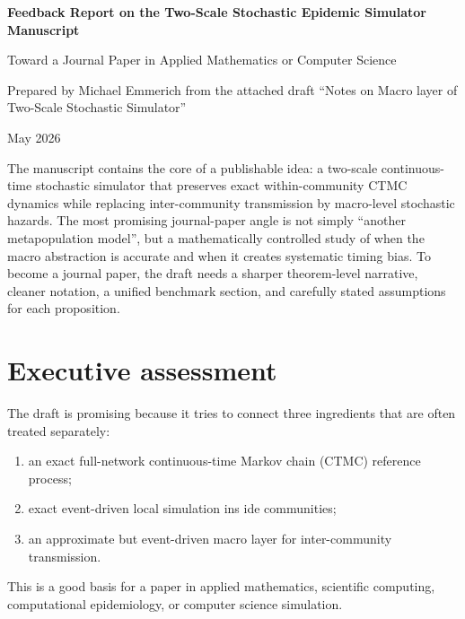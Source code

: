 \documentclass[12pt,a4paper]{article}
\theoremstyle{definition}
\newcommand{\1}{\mathbf{1}}
\begin{document}
\begin{center}
    {\LARGE \bfseries Feedback Report on the Two-Scale Stochastic Epidemic Simulator Manuscript}\par
    \vspace{0.5em}
    {\large Toward a Journal Paper in Applied Mathematics or Computer Science}\par
    \vspace{0.8em}
    {\normalsize Prepared by Michael Emmerich from the attached draft ``Notes on Macro layer of Two-Scale Stochastic Simulator''}\par
    \vspace{0.3em}
    {\normalsize May 2026}\par
\end{center}

\vspace{1em}

\begin{tcolorbox}[colback=gray!5,colframe=gray!60,title=Main diagnosis]
The manuscript contains the core of a publishable idea: a two-scale continuous-time stochastic simulator that preserves exact within-community CTMC dynamics while replacing inter-community transmission by macro-level stochastic hazards.  The most promising journal-paper angle is not simply ``another metapopulation model'', but a mathematically controlled study of when the macro abstraction is accurate and when it creates systematic timing bias.  To become a journal paper, the draft needs a sharper theorem-level narrative, cleaner notation, a unified benchmark section, and carefully stated assumptions for each proposition.
\end{tcolorbox}

\tableofcontents
\newpage

\section{Executive assessment}

The draft is promising because it tries to connect three ingredients that are often treated separately:
\begin{enumerate}
    \item an exact full-network continuous-time Markov chain (CTMC) reference process;
    \item exact event-driven local simulation ins ide communities;
    \item an approximate but event-driven macro layer for inter-community transmission.
\end{enumerate}
This is a good basis for a paper in applied mathematics, scientific computing, computational epidemiology, or computer science simulation.
\end{document}
